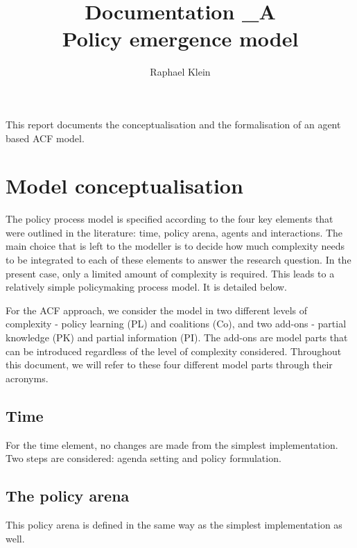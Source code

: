 \documentclass[11pt]{article}
\title{Documentation \_A \\ Policy emergence model}
\author{Raphael Klein}
\begin{document}
\maketitle


This report documents the conceptualisation and the formalisation of an agent based ACF model.

\tableofcontents

\section{Model conceptualisation}

The policy process model is specified according to the four key elements that were outlined in the literature: time, policy arena, agents and interactions. The main choice that is left to the modeller is to decide how much complexity needs to be integrated to each of these elements to answer the research question. In the present case, only a limited amount of complexity is required. This leads to a relatively simple policymaking process model. It is detailed below.

For the ACF approach, we consider the model in two different levels of complexity - policy learning (PL) and coalitions (Co), and two add-ons - partial knowledge (PK) and partial information (PI). The add-ons are model parts that can be introduced regardless of the level of complexity considered. Throughout this document, we will refer to these four different model parts through their acronyms. 

\subsection{Time}

For the time element, no changes are made from the simplest implementation. Two steps are considered: agenda setting and policy formulation.


\subsection{The policy arena}

This policy arena is defined in the same way as the simplest implementation as well.
\end{document}
